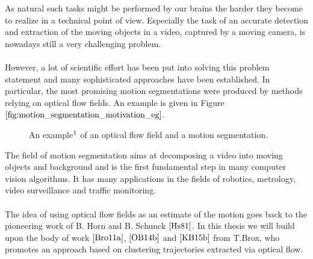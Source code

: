 As natural such tasks might be performed by our brains the harder they become to realize in a technical point of view. Especially the task of an accurate detection and extraction of the moving objects in a video, captured by a moving camera, is nowadays still a very challenging problem. \\ \\
However, a lot of scientific effort has been put into solving this problem statement and many sophisticated approaches have been established. In particular, the most promising motion segmentations were produced by methods relying on optical flow fields. An example is given in Figure $\ref{fig:motion_segmentation_motivation_eg}$.
\begin{figure}[H]
\begin{center}
\end{center}
\caption[Motion Segmentation Motivation Example]{An example$\footnotemark$ of an optical flow field and a motion segmentation. }
\label{fig:motion_segmentation_motivation_eg}
\end{figure}
The field of motion segmentation aims at decomposing a video into moving objects and background and is the first fundamental step in many computer vision algorithms. It has many applications in the fields of robotics, metrology, video surveillance and traffic monitoring. \\ \\
The idea of using optical flow fields as an estimate of the motion goes back to the pioneering work of B. Horn and B. Schunck $\cite{Hs81}$. In this thesis we will build upon the body of work $\cite{Bro11a}$, $\cite{OB14b}$ and $\cite{KB15b}$ from T.Brox, who promotes an approach based on clustering trajectories extracted via optical flow. \\ \\
